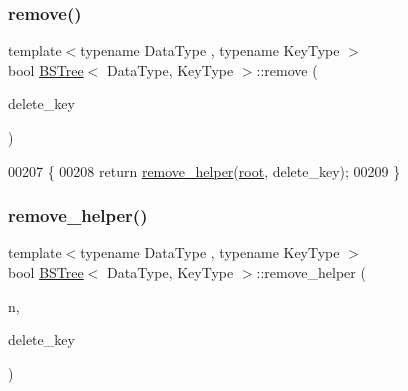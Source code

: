 \subsubsection{\texorpdfstring{remove()}{remove()}}
{\footnotesize\ttfamily template$<$typename Data\+Type , typename Key\+Type $>$ \\
bool \hyperlink{class_b_s_tree}{B\+S\+Tree}$<$ Data\+Type, Key\+Type $>$\+::remove (\begin{DoxyParamCaption}\item[{const Key\+Type \&}]{delete\+\_\+key }\end{DoxyParamCaption})}


\begin{DoxyCode}
00207 \{
00208     \textcolor{keywordflow}{return} \hyperlink{class_b_s_tree_a4bd9d8e6357091ea72da7f62e2ee9577}{remove\_helper}(\hyperlink{class_b_s_tree_a83534afce9094181ac031f9f596a8625}{root}, delete\_key);
00209 \}
\end{DoxyCode}
\hypertarget{class_b_s_tree_a4bd9d8e6357091ea72da7f62e2ee9577}{}\label{class_b_s_tree_a4bd9d8e6357091ea72da7f62e2ee9577} 
\subsubsection{\texorpdfstring{remove\+\_\+helper()}{remove\_helper()}}
{\footnotesize\ttfamily template$<$typename Data\+Type , typename Key\+Type $>$ \\
bool \hyperlink{class_b_s_tree}{B\+S\+Tree}$<$ Data\+Type, Key\+Type $>$\+::remove\+\_\+helper (\begin{DoxyParamCaption}\item[{\hyperlink{class_b_s_tree_1_1_b_s_tree_node}{B\+S\+Tree\+Node} $\ast$\&}]{n,  }\item[{const Key\+Type \&}]{delete\+\_\+key }\end{DoxyParamCaption})\hspace{0.3cm}{\ttfamily [protected]}}


